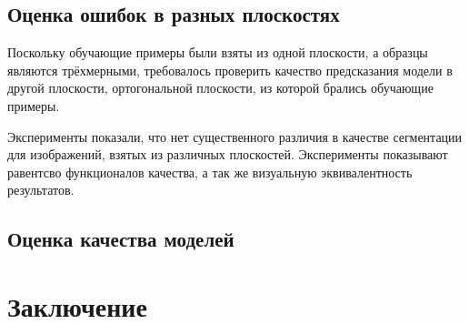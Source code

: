 \documentclass[14pt, a4paper, oneside, bold]{extarticle}
\begin{document}
\subsection{Оценка ошибок в разных плоскостях}

Поскольку обучающие примеры были взяты из одной плоскости, а образцы являются трёхмерными, требовалось проверить качество предсказания модели в другой плоскости, ортогональной плоскости, из которой брались обучающие примеры. 

Эксперименты показали, что нет существенного различия в качестве сегментации для изображений, взятых из различных плоскостей. Эксперименты показывают равентсво функционалов качества, а так же визуальную эквивалентность результатов. 

\subsection{Оценка качества моделей}

\newpage


\section{Заключение}

\newpage


\end{document}
